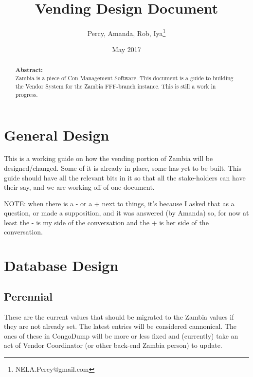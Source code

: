 \documentclass[captions=tablesignature]{scrartcl}
\author{Percy, Amanda, Rob, Iya\thanks{NELA.Percy@gmail.com}}
\date{May 2017}
\title{Vending Design Document}
\begin{document}
\maketitle
{}
\thispagestyle{fancy}
\renewcommand{\headrulewidth}{0pt}
\renewcommand{\footrulewidth}{0pt}
\lhead{}
\rhead{}
\chead{}
\lfoot{}
\cfoot{}
\rfoot{}
\begin{abstract}
\vspace{5cm}
{\LARGE{\textbf{Abstract:\\}}}
Zambia is a piece of Con Management Software.  This document is a guide to building the Vendor System for the Zambia FFF-branch instance.  This is still a work in progress.
\end{abstract}
\newpage
\renewcommand{\headrulewidth}{1pt}
\renewcommand{\footrulewidth}{1pt}
\rfoot{\thepage}
\setcounter{tocdepth}{2}
\tableofcontents
\listoftables
\listoffigures
\newpage
{}
\section{General Design}
\label{sec-1}
This is a working guide on how the vending portion of Zambia will be
designed/changed.  Some of it is already in place, some has yet to
be built.  This guide should have all the relevant bits in it so
that all the stake-holders can have their say, and we are working
off of one document.

NOTE: when there is a - or a + next to things, it's because I asked
that as a question, or made a supposition, and it was answered (by
Amanda) so, for now at least the - is my side of the conversation
and the + is her side of the conversation.

\section{Database Design}
\label{sec-2}
\subsection{Perennial}
\label{sec-2-1}
These are the current values that should be migrated to the Zambia
values if they are not already set.  The latest entries will be
considered cannonical.  The ones of these in CongoDump will be more
or less fixed and (currently) take an act of Vendor Coordinator (or
other back-end Zambia person) to update.  
\end{document}
